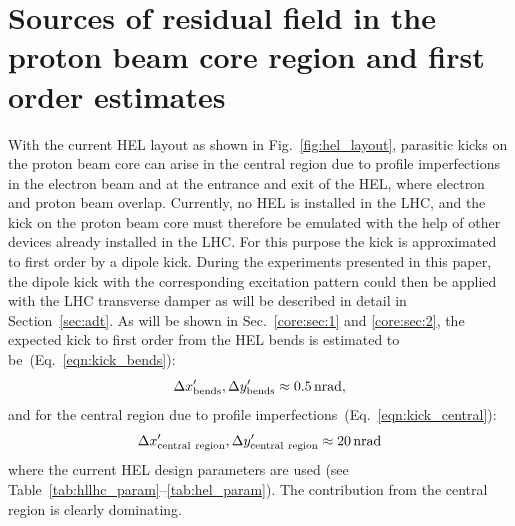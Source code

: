 \documentclass[%
 reprint,
 amsmath,amssymb,
 aps,
prstab,
]{revtex4-1}
\begin{document}

\section{Sources of residual field in the proton beam core region and first order estimates\label{sec:core}}
With the current HEL layout as shown in Fig.~\ref{fig:hel_layout}, parasitic kicks on the proton beam core can arise in the central region due to profile imperfections in the electron beam and at the entrance and exit of the HEL, where electron and proton beam overlap. Currently, no HEL is installed in the LHC, and the kick on the proton beam core must therefore be emulated with the help of other devices already installed in the LHC. For this purpose the kick is approximated to first order by a dipole kick. During the experiments presented in this paper, the dipole kick with the corresponding excitation pattern could then be applied with the LHC transverse damper as will be described in detail in Section~\ref{sec:adt}. As will be shown in Sec.~\ref{core:sec:1} and \ref{core:sec:2}, the expected kick to first order from the HEL bends is estimated to be~(Eq.~\ref{eqn:kick_bends}):
\begin{equation}
	\Delta x'_{\rm{bends}},\Delta y'_{\rm{bends}}\approx \SI{0.5}{nrad},
\end{equation}
and for the central region due to profile imperfections~(Eq.~\ref{eqn:kick_central}):
\begin{equation}
	\Delta x'_{\rm{central \ region}}, \Delta y'_{\rm{central \ region}} \approx \SI{20}{nrad} %
\end{equation}
where the current HEL design parameters are used (see Table~\ref{tab:hllhc_param}--\ref{tab:hel_param}). The contribution from the central region is clearly dominating.
\end{document}
